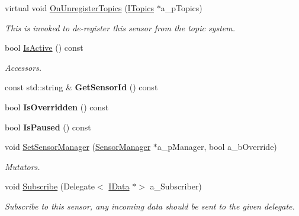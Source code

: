 \begin{DoxyCompactItemize}
\mbox{\label{class_i_sensor_a85727a1d95a93689d471f759f5c647a4}} 
virtual void \hyperlink{class_i_sensor_a85727a1d95a93689d471f759f5c647a4}{On\+Unregister\+Topics} (\hyperlink{class_i_topics}{I\+Topics} $\ast$a\+\_\+p\+Topics)
\begin{DoxyCompactList}\small\item\em This is invoked to de-\/register this sensor from the topic system. \end{DoxyCompactList}\item 
\mbox{\label{class_i_sensor_a0379a7f8ce0552396a922797306f6085}} 
bool \hyperlink{class_i_sensor_a0379a7f8ce0552396a922797306f6085}{Is\+Active} () const
\begin{DoxyCompactList}\small\item\em Accessors. \end{DoxyCompactList}\item 
\mbox{\label{class_i_sensor_a5be397deb901ad32c32ab5d4cbef5259}} 
const std\+::string \& {\bfseries Get\+Sensor\+Id} () const
\item 
\mbox{\label{class_i_sensor_aeb9434bf6b1d8e9552c2f6558d5c641c}} 
bool {\bfseries Is\+Overridden} () const
\item 
\mbox{\label{class_i_sensor_a09e71bf5717196c26461392f0d3c0643}} 
bool {\bfseries Is\+Paused} () const
\item 
\mbox{\label{class_i_sensor_a8fae74cf4b7dec5c42357909276dd102}} 
void \hyperlink{class_i_sensor_a8fae74cf4b7dec5c42357909276dd102}{Set\+Sensor\+Manager} (\hyperlink{class_sensor_manager}{Sensor\+Manager} $\ast$a\+\_\+p\+Manager, bool a\+\_\+b\+Override)
\begin{DoxyCompactList}\small\item\em Mutators. \end{DoxyCompactList}\item 
\mbox{\label{class_i_sensor_a80d29736929d0ff0cf861cefeb5e7896}} 
void \hyperlink{class_i_sensor_a80d29736929d0ff0cf861cefeb5e7896}{Subscribe} (Delegate$<$ \hyperlink{class_i_data}{I\+Data} $\ast$$>$ a\+\_\+\+Subscriber)
\begin{DoxyCompactList}\small\item\em Subscribe to this sensor, any incoming data should be sent to the given delegate. \end{DoxyCompactList}\item 
$$
\end{DoxyCompactItemize}

